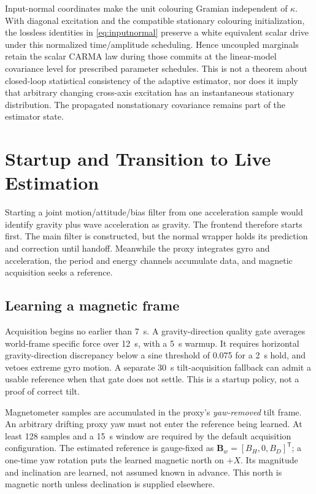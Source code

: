 \documentclass[conference]{IEEEtran}
\newcommand{\vc}[1]{\bm{#1}}
\newcommand{\tr}{^{\mathsf T}}
\begin{document}
Input-normal coordinates make the unit colouring Gramian independent of
$\kappa$. With diagonal excitation and the compatible stationary
colouring initialization, the lossless identities in
\cref{eq:inputnormal} preserve a white equivalent scalar drive under this
normalized time/amplitude scheduling. Hence uncoupled marginals retain
the scalar CARMA law during those commits at the linear-model covariance
level for prescribed parameter schedules. This is not a theorem about
closed-loop statistical consistency of the adaptive estimator, nor does
it imply that
arbitrary changing cross-axis excitation has an instantaneous stationary
distribution. The propagated nonstationary covariance remains part of
the estimator state.

\section{Startup and Transition to Live Estimation}
\label{sec:startup}
Starting a joint motion/attitude/bias filter from one acceleration sample
would identify gravity plus wave acceleration as gravity. The frontend
therefore starts first. The main filter is constructed, but the normal
wrapper holds its prediction and correction until handoff. Meanwhile the
proxy integrates gyro and acceleration, the period and energy channels
accumulate data, and magnetic acquisition seeks a reference.

\subsection{Learning a magnetic frame}
Acquisition begins no earlier than 7~s. A gravity-direction quality gate
averages world-frame specific force over 12~s, with a 5~s warmup. It
requires horizontal gravity-direction discrepancy below a sine threshold
of 0.075 for a 2~s hold, and vetoes extreme gyro motion. A separate 30~s
tilt-acquisition fallback can admit a usable reference when that gate
does not settle. This is a startup policy, not a proof of correct tilt.

Magnetometer samples are accumulated in the proxy's \emph{yaw-removed}
tilt frame. An arbitrary drifting proxy yaw must not enter the reference
being learned. At least 128 samples and a 15~s window are required by the
default acquisition configuration. The estimated reference is gauge-fixed
as $\vc B_w=[B_H,0,B_D]\tr$; a one-time yaw rotation puts the learned
magnetic north on $+X$. Its magnitude and inclination are learned, not
assumed known in advance. This north is magnetic north unless declination
is supplied elsewhere.
\end{document}

